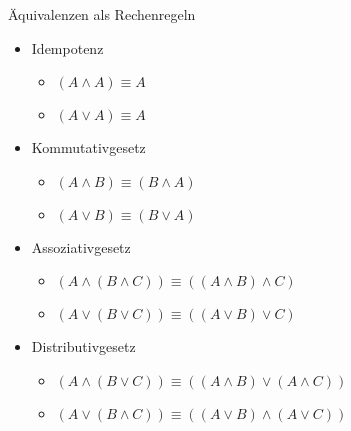 \begin{frame}{Äquivalenzen als Rechenregeln}
	\begin{itemize}
		\item Idempotenz
		\begin{itemize}
			\item $(A \land A) \equiv A$
			\item $(A \lor A) \equiv A$
		\end{itemize}
		\item Kommutativgesetz
		\begin{itemize}
			\item $(A \land B) \equiv (B \land A)$
			\item $(A \lor B) \equiv (B \lor A)$
		\end{itemize}
		\item Assoziativgesetz
		\begin{itemize}
			\item $(A \land (B \land C)) \equiv ((A \land B) \land C)$
			\item $(A \lor (B \lor C)) \equiv ((A \lor B) \lor C)$
		\end{itemize}
		\item Distributivgesetz
		\begin{itemize}
			\item $(A \land (B \lor C)) \equiv ((A \land B) \lor (A \land C))$
			\item $(A \lor (B \land C)) \equiv ((A \lor B) \land (A \lor C))$
		\end{itemize}
	\end{itemize}
\end{frame}

